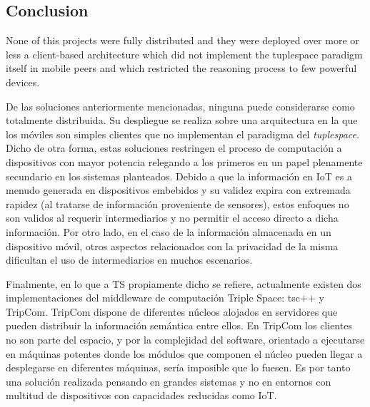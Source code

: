 




\subsection{Conclusion} %





None of this projects were fully distributed and they were deployed over more or less a client-based architecture which did not implement the tuplespace paradigm itself in mobile peers and which restricted the reasoning process to few powerful devices.

De las soluciones anteriormente mencionadas, ninguna puede considerarse como totalmente distribuida. Su despliegue se realiza sobre una arquitectura en la que los móviles son simples clientes que no implementan el paradigma del \textit{tuplespace}. Dicho de otra forma, estas soluciones restringen el proceso de computación a dispositivos con mayor potencia relegando a los primeros en un papel plenamente secundario en los sistemas planteados. Debido a que la información en IoT es a menudo generada en dispositivos embebidos y su validez expira con extremada rapidez (al tratarse de información proveniente de sensores), estos enfoques no son validos al requerir intermediarios y no permitir el acceso directo a dicha información. Por otro lado, en el caso de la información almacenada en un dispositivo móvil, otros aspectos relacionados con la privacidad de la misma dificultan el uso de intermediarios en muchos escenarios.

Finalmente, en lo que a TS propiamente dicho se refiere, actualmente existen dos implementaciones del middleware de computación Triple Space: tsc++ y TripCom. TripCom\cite{tripcom_2011} dispone de diferentes núcleos alojados en servidores que pueden distribuir la información semántica entre ellos. En TripCom los clientes no son parte del espacio, y por la complejidad del software, orientado a ejecutarse en máquinas potentes donde los módulos que componen el núcleo pueden llegar a desplegarse en diferentes máquinas, sería imposible que lo fuesen. Es por tanto una solución realizada pensando en grandes sistemas y no en entornos con multitud de dispositivos con capacidades reducidas como IoT.

